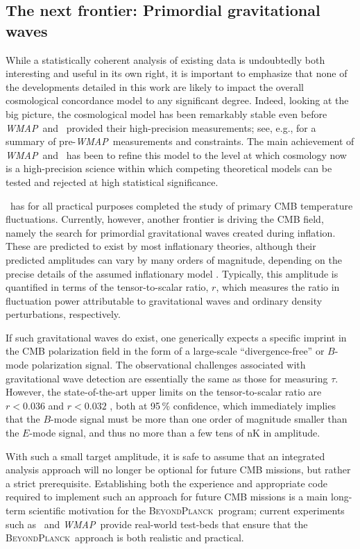 \documentclass[onecolumn]{aa}
\def\WMAP{\emph{WMAP}}
\newcommand{\BP}{\textsc{BeyondPlanck}}
\begin{document}
\subsection{The next frontier: Primordial gravitational waves}
\label{sec:frontier}

While a statistically coherent analysis of existing data is
undoubtedly both interesting and useful in its own right, it is
important to emphasize that none of the developments detailed in this
work are likely to impact the overall cosmological concordance model
to any significant degree. Indeed, looking at the big picture, the
cosmological model has been remarkably stable even before \WMAP\ and
\Planck\ provided their high-precision measurements; see, e.g.,
\citet{wang:2003} for a summary of pre-\WMAP\ measurements and
constraints. The main achievement of \WMAP\ and \Planck\ has been to
refine this model to the level at which cosmology now is a
high-precision science within which competing theoretical models can
be tested and rejected at high statistical significance.

\Planck\ has for all practical purposes completed the study of primary
CMB temperature fluctuations.  Currently, however, another frontier is
driving the CMB field, namely the search for primordial gravitational
waves created during inflation. These are predicted to exist by
most inflationary theories, although their predicted amplitudes can vary
by many orders of magnitude, depending on the precise details of the
assumed inflationary model \citep[e.g.,][]{kamionkowski:2016}. Typically, this amplitude is quantified in
terms of the tensor-to-scalar ratio, $r$, which measures the ratio in
fluctuation power attributable to gravitational waves and ordinary
density perturbations, respectively.

If such gravitational waves do exist, one generically expects a
specific imprint in the CMB polarization field in the form of a
large-scale ``divergence-free'' or $B$-mode polarization signal. The
observational challenges associated with gravitational wave detection
are essentially the same as those for measuring $\tau$.  However, the
state-of-the-art upper limits on the tensor-to-scalar ratio are
$r<0.036$ \citep{bicep2021} and $r<0.032$ \citep{tristram:2021}, both
at 95\,\% confidence, which immediately implies that the $B$-mode
signal must be more than one order of magnitude smaller than the
$E$-mode signal, and thus no more than a few tens of nK in amplitude.

With such a small target amplitude, it is safe to assume that an
integrated analysis approach will no longer be optional for future CMB
missions, but rather a strict prerequisite. Establishing both the
experience and appropriate code required to implement such an approach
for future CMB missions is a main long-term scientific motivation
for the \BP\ program; current experiments such as \Planck\ and
\WMAP\ provide real-world test-beds that ensure that the \BP\ approach
is both realistic and practical.
\end{document}
